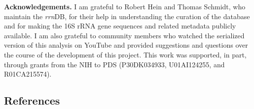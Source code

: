\documentclass[
]{article}
\begin{document}
\vspace{20mm}

\textbf{Acknowledgements.} I am grateful to Robert Hein and Thomas
Schmidt, who maintain the \emph{rrn}DB, for their help in understanding
the curation of the database and for making the 16S rRNA gene sequences
and related metadata publicly available. I am also grateful to community
members who watched the serialized version of this analysis on YouTube
and provided suggestions and questions over the course of the
development of this project. This work was supported, in part, through
grants from the NIH to PDS (P30DK034933, U01AI124255, and R01CA215574).

\newpage

\hypertarget{references}{%
\subsection{References}\label{references}}

\setlength{\parindent}{-0.25in}
\setlength{\leftskip}{0.25in}

\noindent
\end{document}
